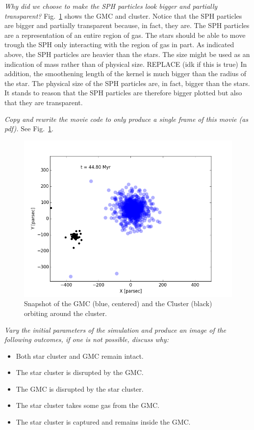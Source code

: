 \documentclass{aa}
\begin{document}
\textit{Why did we choose to make the SPH particles look bigger and partially transparent?} Fig.~\ref{fig:GMC_with_cluster} shows the GMC and cluster. Notice that the SPH particles are bigger and partially transparent because, in fact, they are. The SPH particles are a representation of an entire region of gas. The stars should be able to move trough the SPH only interacting with the region of gas in part. As indicated above, the SPH particles are heavier than the stars. The size might be used as an indication of mass rather than of physical size. REPLACE (idk if this is true) In addition, the smoothening length of the kernel is much bigger than the radius of the star. The physical size of the SPH particles are, in fact, bigger than the stars. It stands to reason that the SPH particles are therefore bigger plotted but also that they are transparent.

\textit{Copy and rewrite the movie code to only produce a single frame of this movie (as pdf).} See Fig.~\ref{fig:GMC_with_cluster}.

\begin{figure}
    \centering
    \includegraphics[width=\hsize]{img/test-44-8.png}
    \caption{Snapshot of the GMC (blue, centered) and the Cluster (black) orbiting around the cluster.}\label{fig:GMC_with_cluster}
\end{figure}

\textit{Vary the initial parameters of the simulation and produce an image of the following outcomes, if one is not possible, discuss why:}
\begin{itemize}
    \item Both star cluster and GMC remain intact.
    \item The star cluster is disrupted by the GMC.
    \item The GMC is disrupted by the star cluster.
    \item The star cluster takes some gas from the GMC.
    \item The star cluster is captured and remains inside the GMC.
\end{itemize}
\end{document}
